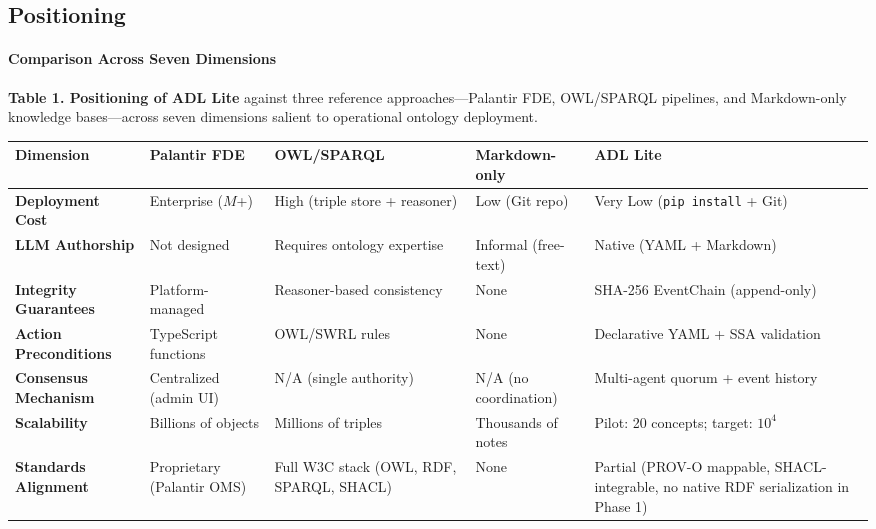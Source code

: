 \subsection{Positioning}\label{positioning}

\paragraph{Comparison Across Seven Dimensions}\label{comparison-across-seven-dimensions}

\textbf{Table 1. Positioning of ADL Lite} against three reference approaches---Palantir FDE, OWL/SPARQL pipelines, and Markdown-only knowledge bases---across seven dimensions salient to operational ontology deployment.

\begin{longtable}[]{@{}>{\raggedright\arraybackslash}p{}
  >{\centering\arraybackslash}p{}
  >{\centering\arraybackslash}p{}
  >{\centering\arraybackslash}p{}
  >{\centering\arraybackslash}p{}@{}}
\toprule
Dimension
& Palantir FDE
& OWL/SPARQL
& Markdown-only
& ADL Lite
\\
\midrule
\endhead
\bottomrule
\endlastfoot
\textbf{Deployment Cost} & Enterprise (\(M\)+) & High (triple store + reasoner) & Low (Git repo) & Very Low (\texttt{pip\ install} + Git) \\
\textbf{LLM Authorship} & Not designed & Requires ontology expertise & Informal (free-text) & Native (YAML + Markdown) \\
\textbf{Integrity Guarantees} & Platform-managed & Reasoner-based consistency & None & SHA-256 EventChain (append-only) \\
\textbf{Action Preconditions} & TypeScript functions & OWL/SWRL rules & None & Declarative YAML + SSA validation \\
\textbf{Consensus Mechanism} & Centralized (admin UI) & N/A (single authority) & N/A (no coordination) & Multi-agent quorum + event history \\
\textbf{Scalability} & Billions of objects & Millions of triples & Thousands of notes & Pilot: 20 concepts; target: \(10^4\) \\
\textbf{Standards Alignment} & Proprietary (Palantir OMS) & Full W3C stack (OWL, RDF, SPARQL, SHACL) & None & Partial (PROV-O mappable, SHACL-integrable, no native RDF serialization in Phase 1) \\
\end{longtable}

